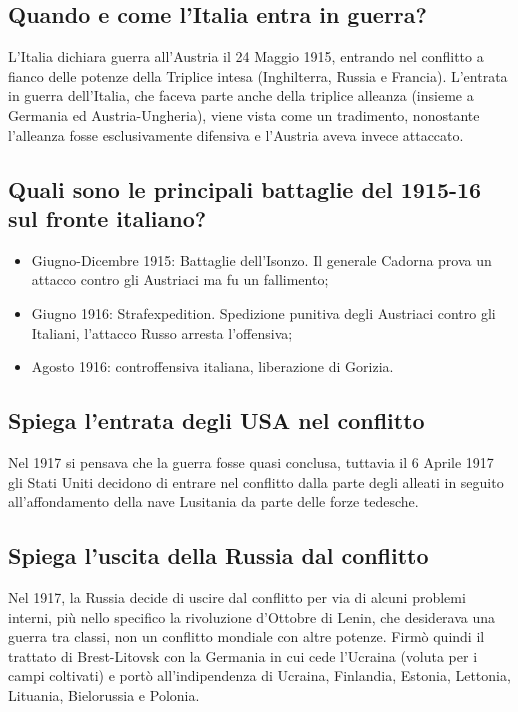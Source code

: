 \documentclass{article}
\begin{document}
\subsection{Quando e come l'Italia entra in guerra?}
L'Italia dichiara guerra all'Austria il 24 Maggio 1915, entrando nel conflitto a fianco delle potenze della Triplice intesa
(Inghilterra, Russia e Francia). L'entrata in guerra dell'Italia, che faceva parte anche della triplice alleanza (insieme a
Germania ed Austria-Ungheria), viene vista come un tradimento, nonostante l'alleanza fosse esclusivamente difensiva e
l'Austria aveva invece attaccato.

\subsection{Quali sono le principali battaglie del 1915-16 sul fronte italiano?}
\begin{itemize}
    \item Giugno-Dicembre 1915: Battaglie dell'Isonzo. Il generale Cadorna prova un attacco contro gli Austriaci ma fu un fallimento;
    \item Giugno 1916: Strafexpedition. Spedizione punitiva degli Austriaci contro gli Italiani, l'attacco Russo arresta l'offensiva;
    \item Agosto 1916: controffensiva italiana, liberazione di Gorizia.
\end{itemize}

\subsection{Spiega l'entrata degli USA nel conflitto}
Nel 1917 si pensava che la guerra fosse quasi conclusa, tuttavia il 6 Aprile 1917 gli Stati Uniti decidono di entrare nel
conflitto dalla parte degli alleati in seguito all'affondamento della nave Lusitania da parte delle forze tedesche.

\subsection{Spiega l'uscita della Russia dal conflitto}
Nel 1917, la Russia decide di uscire dal conflitto per via di alcuni problemi interni, più nello specifico la rivoluzione
d'Ottobre di Lenin, che desiderava una guerra tra classi, non un conflitto mondiale con altre potenze. Firmò quindi il
trattato di Brest-Litovsk con la Germania in cui cede l'Ucraina (voluta per i campi coltivati) e portò all'indipendenza
di Ucraina, Finlandia, Estonia, Lettonia, Lituania, Bielorussia e Polonia.
\end{document}
